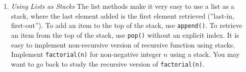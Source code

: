 \documentclass[12pt]{article}
\begin{document}
\begin{enumerate}
\begin{enumerate}
\end{enumerate}
 \item  \textit{Using Lists as Stacks}
The list methods make it very easy to use a list as a stack, where the last element added is the first element retrieved (''last-in, first-out''). To add an item to the top of the stack, use \texttt{append()}. To retrieve an item from the top of the stack, use \texttt{pop()} without an explicit index. It is easy to implement non-recursive version of recursive function using stacks. Implement \texttt{factorial(n)} for non-negative integer $n$ using a stack. You may want to go back to study the recursive version of \texttt{factorial(n)}.

\end{enumerate}
\end{document}
